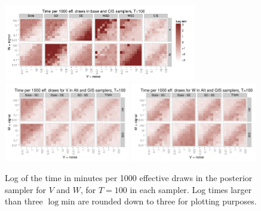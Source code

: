 \documentclass{article}
\begin{document}
\begin{figure}[!h]
\centering
\includegraphics[width=0.75\textwidth]{basecistimeplot100}
\includegraphics[width=0.49\textwidth]{altgisVtimeplot100}
\includegraphics[width=0.49\textwidth]{altgisWtimeplot100}
\caption{Log of the time in minutes per 1000 effective draws in the posterior sampler for $V$ and $W$, for $T=100$ in each sampler. Log times larger than three $\log \mathrm{min}$ are rounded down to three for plotting purposes.}
\label{baseinttimeplot2}
\end{figure}
\end{document}
